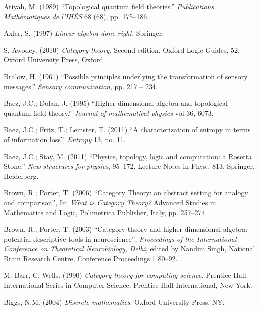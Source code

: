 

\printindex



\begin{thebibliography}{SGWB}\rr

 Atiyah, M. (1989) ``Topological quantum field theories.'' \textit{Publications Math\'{e}matiques de l'IHÉS} 68 (68), pp. 175--186.

 Axler, S. (1997) \textit{Linear algebra done right}. Springer. 

 S. Awodey. (2010) \textit{Category theory.} Second edition. Oxford Logic Guides, 52. Oxford University Press, Oxford.

 Bralow, H. (1961) ``Possible principles underlying the transformation of sensory messages.'' \textit{Sensory communication}, pp. 217 -- 234.

 Baez, J.C.; Dolan, J. (1995) ``Higher-dimensional algebra and topological quantum field theory.'' \textit{Journal of mathematical physics} vol 36, 6073.

 Baez, J.C.; Fritz, T.; Leinster, T. (2011) ``A characterization of entropy in terms of information loss''. \textit{Entropy} 13, no. 11.

 Baez, J.C.; Stay, M. (2011) ``Physics, topology, logic and computation: a Rosetta Stone.'' \textit{New structures for physics}, 95--172. Lecture Notes in Phys., 813, Springer, Heidelberg.

 Brown, R.; Porter, T. (2006) ``Category Theory: an abstract setting for
analogy and comparison'', In: \textit{What is Category Theory?} Advanced
Studies in Mathematics and Logic, Polimetrica Publisher, Italy, pp. 257--274.

 Brown, R.; Porter, T. (2003) ``Category theory and higher dimensional
algebra: potential descriptive tools in neuroscience'', \textit{Proceedings
of the International Conference on Theoretical Neurobiology, Delhi}, edited by Nandini Singh, National Brain Research
Centre, Conference Proceedings 1 80--92. 

 M. Barr, C. Wells. (1990) \textit{Category theory for computing science.} Prentice Hall International Series in Computer Science. Prentice Hall International, New York.

 Biggs, N.M. (2004) \textit{Discrete mathematics}. Oxford University Press, NY. 


\end{thebibliography}
